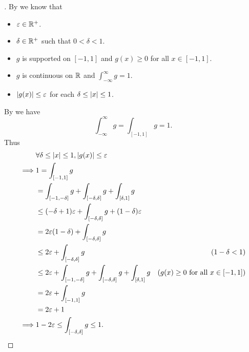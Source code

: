 \begin{proof}[]
  By  we know that
  \begin{itemize}
    \item \(\varepsilon \in \mathbb{R}^+\).
    \item \(\delta \in \mathbb{R}^+\) such that \(0 < \delta < 1\).
    \item \(g\) is supported on \([-1, 1]\) and \(g(x) \geq 0\) for all \(x \in [-1, 1]\).
    \item \(g\) is continuous on \(\mathbb{R}\) and \(\int_{-\infty}^\infty g = 1\).
    \item \(\left\lvert g(x)\right\rvert \leq \varepsilon\) for each \(\delta \leq \left\lvert x\right\rvert \leq 1\).
  \end{itemize}
  By  we have
  \[
    \int_{-\infty}^\infty g = \int_{[-1, 1]} g = 1.
  \]
  Thus
  \begin{align*}
             & \forall \delta \leq \left\lvert x\right\rvert \leq 1, \left\lvert g(x)\right\rvert \leq \varepsilon                                                                                \\
    \implies & 1 = \int_{[-1, 1]} g                                                                                                                           \\
             & = \int_{[-1, -\delta]} g + \int_{[-\delta, \delta]} g + \int_{[\delta, 1]} g                                                                   \\
             & \leq (-\delta + 1) \varepsilon + \int_{[-\delta, \delta]} g + (1 - \delta) \varepsilon                                                         \\
             & = 2 \varepsilon (1 - \delta) + \int_{[-\delta, \delta]} g                                                                                      \\
             & \leq 2 \varepsilon + \int_{[-\delta, \delta]} g                                                 & (1 - \delta < 1)                             \\
             & \leq 2 \varepsilon + \int_{[-1, -\delta]} g + \int_{[-\delta, \delta]} g + \int_{[\delta, 1]} g & (g(x) \geq 0 \text{ for all } x \in [-1, 1]) \\
             & = 2 \varepsilon + \int_{[-1, 1]} g                                                                                                             \\
             & = 2 \varepsilon + 1                                                                                                                            \\
    \implies & 1 - 2 \varepsilon \leq \int_{[-\delta, \delta]} g \leq 1.
  \end{align*}
\end{proof}

